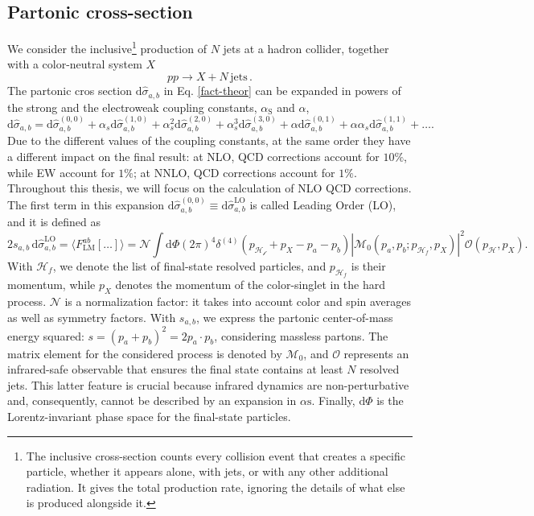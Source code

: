 \documentclass[a4paper, 12pt]{book}
\begin{document}
\subsection{Partonic cross-section}
We consider the inclusive\footnote{The inclusive cross-section counts every collision event that creates a specific particle, whether it appears alone, with jets, or with any other additional radiation. It gives the total production rate, ignoring the details of what else is produced alongside it.} production of $N$ jets at a hadron collider, together with a color-neutral system $X$
\begin{equation}
    pp \rightarrow X + N \, \mathrm{jets}  \, .
\end{equation}
The partonic cros section $\mathrm{d}\hat{\sigma}_{a,b}$ in Eq. \ref{fact-theor} can be expanded in powers of the strong and the electroweak coupling constants, $\alpha_{\text{S}}$ and $\alpha$,
\begin{equation}
    \text{d} \hat{\sigma}_{a,b} = \text{d} \hat{\sigma}_{a,b}^{(0,0)} + \alpha_s \text{d} \hat{\sigma}_{a,b}^{(1,0)} + \alpha_s^2 \text{d} \hat{\sigma}_{a,b}^{(2,0)} + \alpha_s^3 \text{d} \hat{\sigma}_{a,b}^{(3,0)} + \alpha \text{d} \hat{\sigma}_{a,b}^{(0,1)} + \alpha \alpha_s \text{d} \hat{\sigma}_{a,b}^{(1,1)} + \dots .
\end{equation}
Due to the different values of the coupling constants, at the same order they have a different impact on the final result: at NLO, QCD corrections account for $10\%$, while EW account for $1\%$; at NNLO, QCD corrections account for $1\%$. Throughout this thesis, we will focus on the calculation of NLO QCD corrections. \\
The first term in this expansion $\text{d} \hat{\sigma}_{a,b}^{(0,0)} \equiv \text{d} \hat{\sigma}_{a,b}^{\text{LO}}$ is called Leading Order (LO), and it is defined as \cite{Devoto:2025jql}
\begin{equation}
    2s_{a,b} \, \text{d} \hat{\sigma}_{a,b}^{\text{LO}} = \langle F^{ab}_{\mathrm{LM}}[\dots] \rangle = \mathcal{N} \int \mathrm{d}\Phi (2\pi)^4 \delta^{(4)}(p_\mathcal{H_f}+p_X-p_a-p_b) \left|\mathcal{M}_0(p_a,p_b;p_{\mathcal{H}_f},p_X) \right|^2 \mathcal{O}(p_\mathcal{H},p_X).
    \label{leading-order}
\end{equation}
With $\mathcal{H}_f$, we denote the list of final-state resolved particles, and $p_{\mathcal{H}_f}$ is their momentum, while $p_X$ denotes the momentum of the color-singlet in the hard process. $\mathcal{N}$ is a normalization factor: it takes into account color and spin averages as well as symmetry factors. With $s_{a,b}$, we express the partonic center-of-mass energy squared: $s=(p_a+p_b)^2=2 p_a\cdot p_b$, considering massless partons. The matrix element for the considered process is denoted by $\mathcal{M}_0$, and $\mathcal{O}$ represents an infrared-safe observable that ensures the final state contains at least $N$ resolved jets. This latter feature is crucial because infrared dynamics are non-perturbative and, consequently, cannot be described by an expansion in $\alpha\mathrm{s}$. Finally, $\mathrm{d}\Phi$ is the Lorentz-invariant phase space for the final-state particles.
\end{document}
